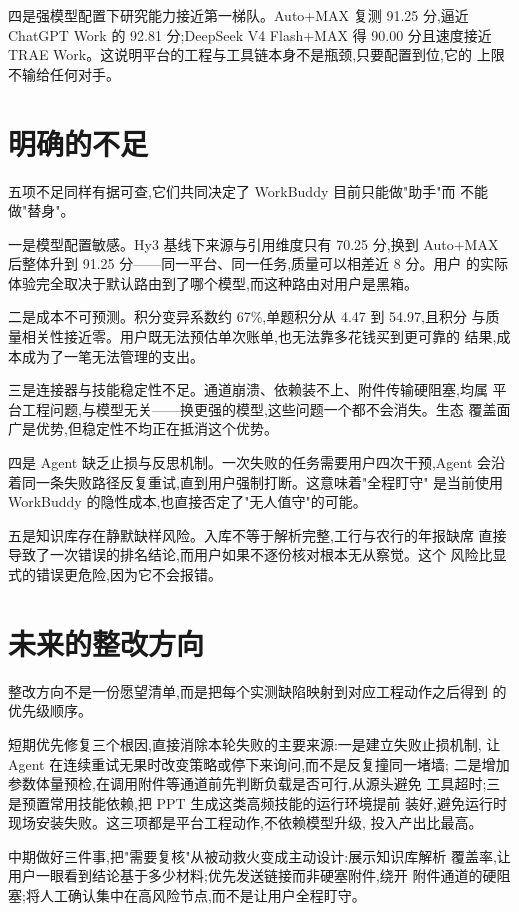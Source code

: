 \documentclass[
  12pt,
  a4paper,
  oneside,
  headings=normal,
  numbers=noendperiod,
  listof=totoc,
  bibliography=totoc
]{scrreprt}
\begin{document}
四是强模型配置下研究能力接近第一梯队。Auto+MAX 复测 91.25 分,逼近
ChatGPT Work 的 92.81 分;DeepSeek V4 Flash+MAX 得 90.00 分且速度接近
TRAE Work。这说明平台的工程与工具链本身不是瓶颈,只要配置到位,它的
上限不输给任何对手。

\section{明确的不足}

五项不足同样有据可查,它们共同决定了 WorkBuddy 目前只能做"助手"而
不能做"替身"。

一是模型配置敏感。Hy3 基线下来源与引用维度只有 70.25 分,换到 Auto+MAX
后整体升到 91.25 分——同一平台、同一任务,质量可以相差近 8 分。用户
的实际体验完全取决于默认路由到了哪个模型,而这种路由对用户是黑箱。

二是成本不可预测。积分变异系数约 67\%,单题积分从 4.47 到 54.97,且积分
与质量相关性接近零。用户既无法预估单次账单,也无法靠多花钱买到更可靠的
结果,成本成为了一笔无法管理的支出。

三是连接器与技能稳定性不足。通道崩溃、依赖装不上、附件传输硬阻塞,均属
平台工程问题,与模型无关——换更强的模型,这些问题一个都不会消失。生态
覆盖面广是优势,但稳定性不均正在抵消这个优势。

四是 Agent 缺乏止损与反思机制。一次失败的任务需要用户四次干预,Agent
会沿着同一条失败路径反复重试,直到用户强制打断。这意味着"全程盯守"
是当前使用 WorkBuddy 的隐性成本,也直接否定了"无人值守"的可能。

五是知识库存在静默缺样风险。入库不等于解析完整,工行与农行的年报缺席
直接导致了一次错误的排名结论,而用户如果不逐份核对根本无从察觉。这个
风险比显式的错误更危险,因为它不会报错。

\section{未来的整改方向}

整改方向不是一份愿望清单,而是把每个实测缺陷映射到对应工程动作之后得到
的优先级顺序。

短期优先修复三个根因,直接消除本轮失败的主要来源:一是建立失败止损机制,
让 Agent 在连续重试无果时改变策略或停下来询问,而不是反复撞同一堵墙;
二是增加参数体量预检,在调用附件等通道前先判断负载是否可行,从源头避免
工具超时;三是预置常用技能依赖,把 PPT 生成这类高频技能的运行环境提前
装好,避免运行时现场安装失败。这三项都是平台工程动作,不依赖模型升级,
投入产出比最高。

中期做好三件事,把"需要复核"从被动救火变成主动设计:展示知识库解析
覆盖率,让用户一眼看到结论基于多少材料;优先发送链接而非硬塞附件,绕开
附件通道的硬阻塞;将人工确认集中在高风险节点,而不是让用户全程盯守。
\end{document}
